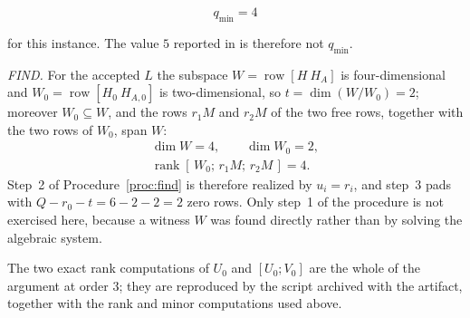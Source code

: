\documentclass[journal]{IEEEtran}
\theoremstyle{plainn}
\theoremstyle{remark}
\begin{document}
\begin{equation*}
q_{\min}=4
\end{equation*}

for this instance. The value $5$ reported in \cite[Sec.~VII]{fer26b} is therefore not $q_{\min}$.

\emph{FIND.} For the accepted $L$ the subspace $W=\operatorname{row}[H\ H_A]$ is four-dimensional and
$W_0=\operatorname{row}[H_0\ H_{A,0}]$ is two-dimensional, so $t=\dim(W/W_0)=2$; moreover $W_0\subseteq
W$, and the rows $r_1M$ and $r_2M$ of the two free rows, together with the two rows of $W_0$, span
$W$:
\begin{equation*}
\begin{gathered}
\dim W=4,\qquad \dim W_0=2,\\
\operatorname{rank}[\,W_0;\,r_1M;\,r_2M\,]=4 .
\end{gathered}
\end{equation*}
Step~2 of Procedure~\ref{proc:find} is therefore realized by $u_i=r_i$, and step~3 pads with
$Q-r_0-t=6-2-2=2$ zero rows. Only step~1 of the procedure is not exercised here, because a witness
$W$ was found directly rather than by solving the algebraic system.

The two exact rank computations of $U_0$ and $[U_0;V_0]$ are the whole of the argument at order
$3$; they are reproduced by the script archived with the artifact, together with the rank and
minor computations used above.
\end{document}
